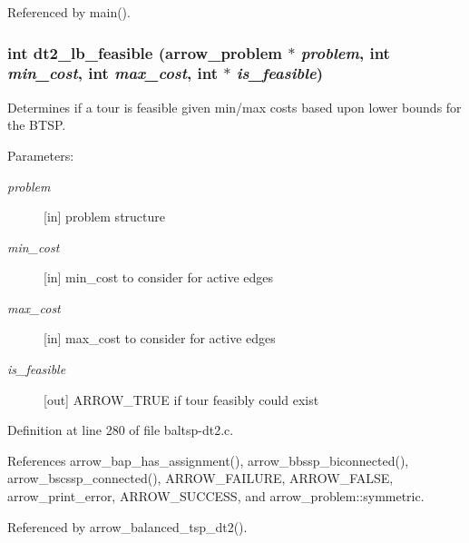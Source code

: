 Referenced by main().\hypertarget{lib_2baltsp_2baltsp-dt2_8c_f6f20f6ccad84917d1405ed863e35b7f}{
\subsubsection[{dt2\_\-lb\_\-feasible}]{\setlength{\rightskip}{0pt plus 5cm}int dt2\_\-lb\_\-feasible ({\bf arrow\_\-problem} $\ast$ {\em problem}, \/  int {\em min\_\-cost}, \/  int {\em max\_\-cost}, \/  int $\ast$ {\em is\_\-feasible})}}
\label{lib_2baltsp_2baltsp-dt2_8c_f6f20f6ccad84917d1405ed863e35b7f}


Determines if a tour is feasible given min/max costs based upon lower bounds for the BTSP. 

\begin{Desc}
\item[Parameters:]
\begin{description}
\item[{\em problem}]\mbox{[}in\mbox{]} problem structure \item[{\em min\_\-cost}]\mbox{[}in\mbox{]} min\_\-cost to consider for active edges \item[{\em max\_\-cost}]\mbox{[}in\mbox{]} max\_\-cost to consider for active edges \item[{\em is\_\-feasible}]\mbox{[}out\mbox{]} ARROW\_\-TRUE if tour feasibly could exist \end{description}
\end{Desc}


Definition at line 280 of file baltsp-dt2.c.

References arrow\_\-bap\_\-has\_\-assignment(), arrow\_\-bbssp\_\-biconnected(), arrow\_\-bscssp\_\-connected(), ARROW\_\-FAILURE, ARROW\_\-FALSE, arrow\_\-print\_\-error, ARROW\_\-SUCCESS, and arrow\_\-problem::symmetric.

Referenced by arrow\_\-balanced\_\-tsp\_\-dt2().
